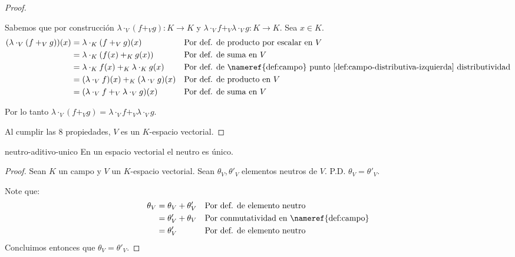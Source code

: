 \begin{proof}
\begin{enumerate}
        Sabemos que por construcción $\lambda \cdot_V (f +_V g): K \rightarrow K$ y $\lambda \cdot_V f +_V \lambda \cdot_V g: K \rightarrow K$. Sea $x \in K$.
        \begin{align*}
            (\lambda \cdot_V (f +_V g))(x) &= \lambda \cdot_K (f +_V g)(x) && \text{Por def. de producto por escalar en $V$} \\
            &= \lambda \cdot_K (f(x) +_K g(x)) && \text{Por def. de suma en $V$} \\
            &= \lambda \cdot_K f(x) +_K \lambda \cdot_K g(x) && \text{Por def. de \nameref{def:campo} punto \ref{def:campo-distributiva-izquierda} distributividad} \\
            &= (\lambda \cdot_V f)(x) +_K (\lambda \cdot_V g)(x) && \text{Por def. de producto en $V$} \\
            &= (\lambda \cdot_V f +_V \lambda \cdot_V g)(x) && \text{Por def. de suma en $V$}
        \end{align*}

        Por lo tanto $\lambda \cdot_V (f +_V g) = \lambda \cdot_V f +_V \lambda \cdot_V g$.

    \end{enumerate}

    Al cumplir las 8 propiedades, $V$ es un $K$-espacio vectorial.
\end{proof}



\begin{proposition}{}{neutro-aditivo-unico}
    En un espacio vectorial el neutro es único.
\end{proposition}
\begin{proof}
    
    Sean $K$ un campo y $V$ un $K$-espacio vectorial. Sean $\theta_V, \theta'_V$ elementos neutros de $V$. P.D. $\theta_V = \theta'_V$.

    Note que:
    \begin{align*}
        \theta_V &= \theta_V + \theta'_V && \text{Por def. de elemento neutro} \\
        &= \theta'_V +  \theta_V && \text{Por conmutatividad en \nameref{def:campo}} \\
        &= \theta'_V && \text{Por def. de elemento neutro}
    \end{align*}
    Concluimos entonces que $\theta_V = \theta'_V$.
\end{proof}


